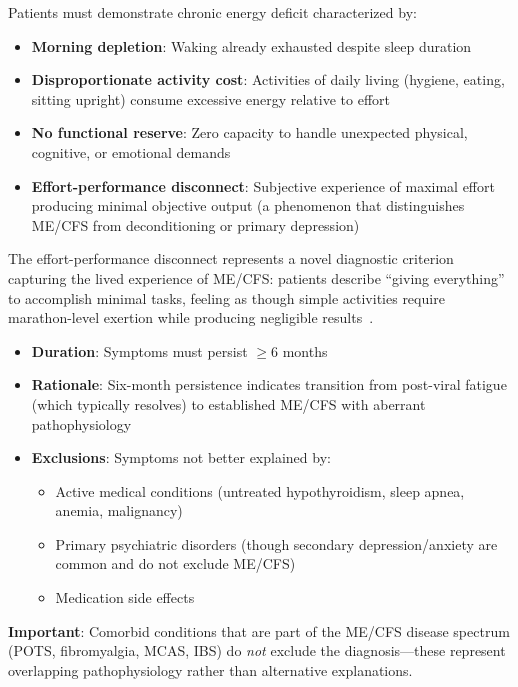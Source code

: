 \begin{requirement}
\label{req:energy-insufficiency}
Patients must demonstrate chronic energy deficit characterized by:

\begin{itemize}
    \item \textbf{Morning depletion}: Waking already exhausted despite sleep duration
    \item \textbf{Disproportionate activity cost}: Activities of daily living (hygiene, eating, sitting upright) consume excessive energy relative to effort
    \item \textbf{No functional reserve}: Zero capacity to handle unexpected physical, cognitive, or emotional demands
    \item \textbf{Effort-performance disconnect}: Subjective experience of maximal effort producing minimal objective output (a phenomenon that distinguishes ME/CFS from deconditioning or primary depression)
\end{itemize}

The effort-performance disconnect represents a novel diagnostic criterion capturing the lived experience of ME/CFS: patients describe ``giving everything'' to accomplish minimal tasks, feeling as though simple activities require marathon-level exertion while producing negligible results~\cite{strassheim2021experiences,fennell2021elements}.
\end{requirement}

\begin{requirement}
\label{req:duration-exclusion}
\begin{itemize}
    \item \textbf{Duration}: Symptoms must persist $\geq$6 months
    \item \textbf{Rationale}: Six-month persistence indicates transition from post-viral fatigue (which typically resolves) to established ME/CFS with aberrant pathophysiology~\cite{Maksoud2020natural}
    \item \textbf{Exclusions}: Symptoms not better explained by:
    \begin{itemize}
        \item Active medical conditions (untreated hypothyroidism, sleep apnea, anemia, malignancy)
        \item Primary psychiatric disorders (though secondary depression/anxiety are common and do not exclude ME/CFS)
        \item Medication side effects
    \end{itemize}
\end{itemize}

\textbf{Important}: Comorbid conditions that are part of the ME/CFS disease spectrum (POTS, fibromyalgia, MCAS, IBS) do \textit{not} exclude the diagnosis---these represent overlapping pathophysiology rather than alternative explanations.
\end{requirement}

